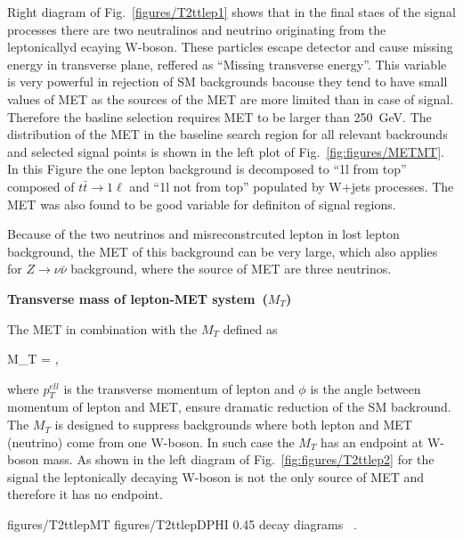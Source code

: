 Right diagram of Fig.~\ref{figures/T2ttlep1} shows that in the final staes of the signal processes there are two neutralinos and neutrino originating from the leptonicallyd ecaying W-boson. These particles escape detector and cause missing energy in transverse plane, reffered as ``Missing transverse energy''. This variable is very powerful in rejection of SM backgrounds bacouse they tend to have small values of MET as the sources of the MET are more limited than in case of signal. Therefore the basline selection requires MET to be larger than 250~GeV. The distribution of the MET in the baseline search region for all relevant backrounds and selected signal points is shown in the left plot of Fig.~\ref{fig:figures/METMT}. In this Figure the one lepton background is decomposed to ``1l from top'' composed of $t \bar{t} \to 1\ell$ and ``1l not from top'' populated by W+jets processes. The MET was also found to be good variable for definiton of signal regions.

Because of the two neutrinos and misreconstrcuted lepton in lost lepton background, the MET of this background can be very large, which also applies for $Z \to \nu \bar{\nu}$ background, where the source of MET are three neutrinos.

\textbf{Transverse mass of lepton-MET system~($M_{T}$)}

The MET in combination with the $M_{T}$ defined as

{
 M_{T} =  ,
}

where $p_{T}^{ell}$ is the transverse momentum of lepton and $\phi$ is the angle between momentum of lepton and MET, ensure dramatic reduction of the SM backround. The $M_{T}$ is  designed to suppress backgrounds where both lepton and MET (neutrino) come from one W-boson. In such case the $M_{T}$ has an endpoint at W-boson mass. As shown in the left diagram of Fig.~\ref{fig:figures/T2ttlep2} for the signal the leptonically decaying W-boson is not the only source of MET and therefore it has no endpoint.

                 {figures/T2ttlepMT} %
                 {figures/T2ttlepDPHI} %
                 {0.45}       %
                 { decay diagrams ~\cite{CMS:2016vew}. }

